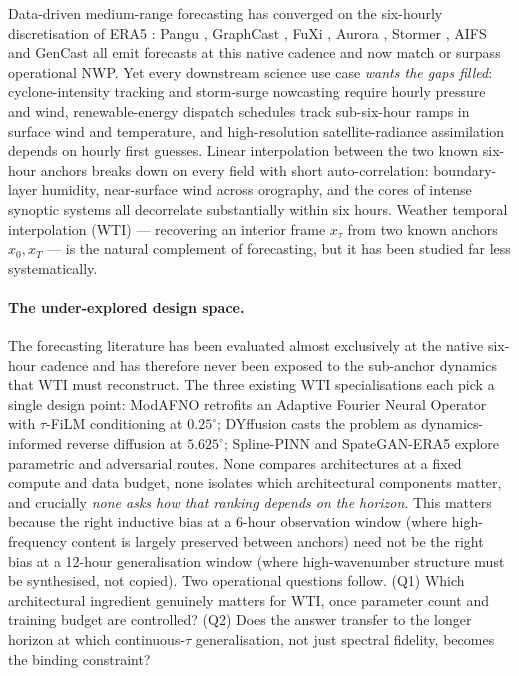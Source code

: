 \documentclass[10pt,letterpaper,twocolumn]{article}
\begin{document}
Data-driven medium-range forecasting has converged on the six-hourly
discretisation of ERA5 \cite{hersbach2020era5}: Pangu
\cite{bi2022pangu}, GraphCast \cite{lam2023graphcast}, FuXi
\cite{chen2023fuxi}, Aurora \cite{bodnar2024aurora}, Stormer
\cite{nguyen2024stormer}, AIFS \cite{lang2024aifs} and GenCast
\cite{price2024genwc} all emit forecasts at this native cadence and now
match or surpass operational NWP. Yet every downstream science use case
\emph{wants the gaps filled}: cyclone-intensity tracking and storm-surge
nowcasting require hourly pressure and wind, renewable-energy dispatch
schedules track sub-six-hour ramps in surface wind and temperature, and
high-resolution satellite-radiance assimilation depends on hourly first
guesses. Linear interpolation between the two known six-hour anchors
breaks down on every field with short auto-correlation: boundary-layer
humidity, near-surface wind across orography, and the cores of intense
synoptic systems all decorrelate substantially within six hours. Weather
temporal interpolation (WTI) — recovering an interior frame
$x_\tau$ from two known anchors $x_0, x_T$ — is the natural complement
of forecasting, but it has been studied far less systematically.

\paragraph{The under-explored design space.}
The forecasting literature has been evaluated almost exclusively at the
native six-hour cadence and has therefore never been exposed to the
sub-anchor dynamics that WTI must reconstruct. The three existing WTI
specialisations each pick a single design point: ModAFNO
\cite{leinonen2024modafno} retrofits an Adaptive Fourier Neural
Operator with $\tau$-FiLM conditioning at $0.25^\circ$; DYffusion
\cite{cachay2023dyffusion} casts the problem as dynamics-informed
reverse diffusion at $5.625^\circ$; Spline-PINN \cite{wandel2022splinepinn}
and SpateGAN-ERA5 \cite{vandeschrik2024spategan} explore parametric and
adversarial routes. None compares architectures at a fixed compute and
data budget, none isolates which architectural components matter, and
crucially \emph{none asks how that ranking depends on the horizon}. This
matters because the right inductive bias at a 6-hour observation window
(where high-frequency content is largely preserved between anchors) need
not be the right bias at a 12-hour generalisation window (where
high-wavenumber structure must be synthesised, not copied). Two
operational questions follow. (Q1) Which architectural ingredient
genuinely matters for WTI, once parameter count and training budget are
controlled? (Q2) Does the answer transfer to the longer horizon at
which continuous-$\tau$ generalisation, not just spectral fidelity,
becomes the binding constraint?
\end{document}
